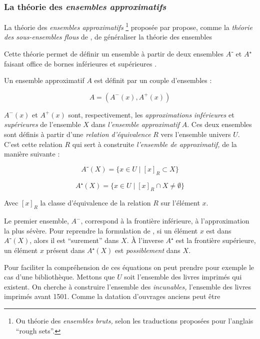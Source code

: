 \subsubsection{La théorie des \emph{ensembles approximatifs}}


La théorie des \emph{ensembles approximatifs} \footnote{Ou théorie des
  \emph{ensembles bruts,} selon les traductions proposées pour
  l'anglais \enquote{rough sets}.} proposée par \textcite{Pawlak1982}
propose, comme la \emph{théorie des sous-ensembles flous} de
\textcite{Zadeh1965}, de généraliser la théorie des ensembles

Cette théorie permet de définir un ensemble à partir de deux ensembles
$A⁻$ et $A⁺$ faisant office de bornes inférieures et supérieures
\autocite{Gacogne1997}.

Un ensemble approximatif $A$ est définit par un couple d'ensembles :

\begin{equation}
  A = (A^-(x),A^+(x))  
\end{equation}

$A^-(x)$ et $A^+(x)$ sont, respectivement, les \emph{approximations}
\emph{inférieures} et \emph{supérieures} de l'ensemble $X$ dans
\emph{l'ensemble approximatif} $A$. Ces deux ensembles sont définis à
partir d'une \emph{relation d'équivalence} $R$ vers l'ensemble univers
$U$. C'est cette relation $R$ qui sert à construite \emph{l'ensemble
  de approximatif,} de la manière suivante :

\begin{equation}
  A⁻(X) = \{ x ∈ U ∣ [x]_R ⊂ X \}
\end{equation}

\begin{equation}
  A⁺(X) = \{ x ∈ U ∣ [x]_R ∩ X ≠ ∅ \}
\end{equation}

Avec $[x]_R$ la classe d'équivalence de la relation $R$ sur l'élément
$x$.

Le premier ensemble, $A^-$, correspond à la frontière inférieure, à
l'approximation la plus sévère. Pour reprendre la formulation de
\textcite{Pawlak1982}, si un élément $x$ est dans $A⁻(X)$, alors il
est \enquote{surement} dans $X$. À l'inverse $A⁺$ est la frontière
supérieure, un élément $x$ présent dans $A⁺(X)$ est
\emph{possiblement} dans $X$.


Pour faciliter la compréhension de ces équations on peut prendre pour
exemple le cas d'une bibliothèque. Mettons que $U$ soit l'ensemble des
livres imprimés qui existent. On cherche à construire l'ensemble des
\emph{incunables,} \ie l'ensemble des livres imprimés avant
1501. Comme la datation d'ouvrages anciens peut être 

